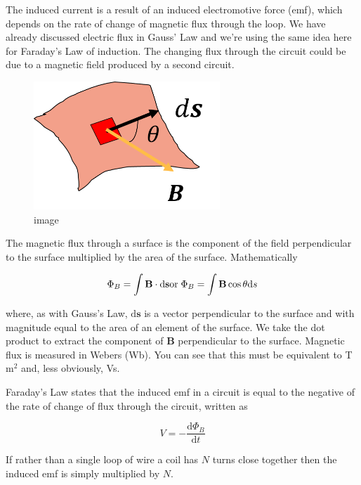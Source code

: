 \documentclass[
]{book}
\numberwithin{equation}{section}
\begin{document}
The induced current is a result of an induced electromotive force (emf),
which depends on the rate of change of magnetic flux through the loop.
We have already discussed electric flux in Gauss' Law and we're using
the same idea here for Faraday's Law of induction. The changing flux
through the circuit could be due to a magnetic field produced by a
second circuit.

\begin{figure}
\centering
\includegraphics[width=70mm,height=\textheight]{Figures/magFlux.png}
\caption{image}
\end{figure}

The magnetic flux through a surface is the component of the field
perpendicular to the surface multiplied by the area of the surface.
Mathematically

\begin{equation}
\label{eq:magFlux}
\Phi_B = \int\mathbf{B} \cdot \mathrm{d}\mathbf{s} \\  
\text{or} \; \Phi_B = \int \mathbf{B} \cos\theta \mathrm{d} s
\end{equation}

where, as with Gauss's Law, \(\mathrm{d} \mathbf{s}\) is a vector perpendicular to the
surface and with magnitude equal to the area of an element of the
surface. We take the dot product to extract the component of \(\mathbf{B}\)
perpendicular to the surface. Magnetic flux is measured in Webers (Wb).
You can see that this must be equivalent to T m\(^2\) and, less obviously,
Vs.

Faraday's Law states that the induced emf in a circuit is equal to the
negative of the rate of change of flux through the circuit, written as

\begin{equation}
\label{eq:faradaysLaw}
V = - \frac{\mathrm{d} \Phi_B}{\mathrm{d} t}
\end{equation}

If rather than a single loop of wire a coil has \(N\) turns close together
then the induced emf is simply multiplied by \(N\).
\end{document}
